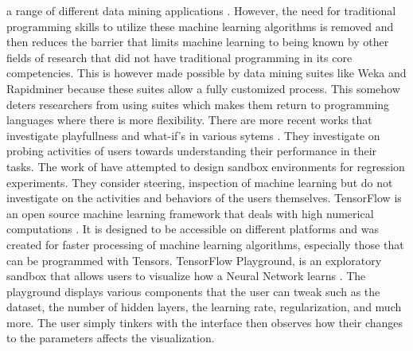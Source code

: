 \documentclass{sigchi}
\begin{document}
a range of different data mining applications \cite{milos2013using}. However, the need for traditional programming skills to utilize these machine learning algorithms is removed and then reduces the barrier that limits machine learning to being known by other fields of research that did not have traditional programming in its core competencies. This is however made possible by data mining suites like Weka and Rapidminer because these suites allow a fully customized process. This somehow deters researchers from using suites which makes them return to programming languages where there is more flexibility. There are more recent works that investigate playfullness and what-if's in various sytems \cite{wexler2019if}. They investigate on probing activities of users towards understanding their performance in their tasks. The work of \cite{das2019beames, zhao2019featureexplorer} have attempted to design sandbox environments for regression experiments. They consider steering, inspection of machine learning but do not investigate on the activities and behaviors of the users themselves. TensorFlow is an open source machine learning framework that deals with high numerical computations \cite{tensorflow_2015}. It is designed to be accessible on different platforms and was created for faster processing of machine learning algorithms, especially those that can be programmed with Tensors. TensorFlow Playground,  is an exploratory sandbox that allows users to visualize how a Neural Network learns \cite{tensorflow_2016}. The playground displays various components that the user can tweak such as the dataset, the number of hidden layers, the learning rate, regularization, and much more. The user simply tinkers with the interface then observes how their changes to the parameters affects the visualization. 
\end{document}
